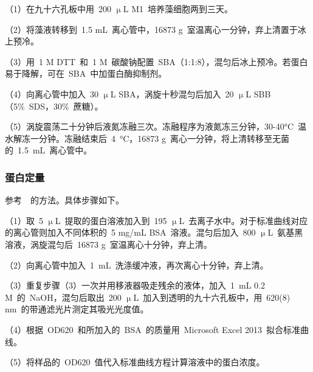 （1）在九十六孔板中用\ 200 $\upmu$L M1\ 培养藻细胞两到三天。

（2）将藻液转移到\ 1.5 mL\ 离心管中，16873 g\ 室温离心一分钟，弃上清置于冰上预冷。

（3）用\ 1 M DTT\ 和\ 1 M\ 碳酸钠配置\ SBA（1:1:8），混匀后冰上预冷。若蛋白易于降解，可在\ SBA\ 中加蛋白酶抑制剂。

（4）向离心管中加入\ 30 $\upmu$L SBA，涡旋十秒混匀后加入\ 20 $\upmu$L SBB（5\%\ SDS，30\%\ 蔗糖）。

（5）涡旋震荡二十分钟后液氮冻融三次。冻融程序为液氮冻三分钟，30-40\si{\degreeCelsius}\ 温水解冻一分钟。冻融结束后\ \SI{4}{\degreeCelsius}，16873 g\ 离心一分钟，将上清转移至无菌的\ \SI{1.5}{\mL}\ 离心管中。

\subsubsection{蛋白定量}
参考\ \citet{Hu2014}\ 的方法。具体步骤如下。

（1）取\ 5 $\upmu$L\ 提取的蛋白溶液加入到\ 195 $\upmu$L\ 去离子水中。对于标准曲线对应的离心管则加入不同体积的\ 5 mg/mL BSA\ 溶液。混匀后加入\ 800 $\upmu$L\ 氨基黑溶液，涡旋混匀后\ 16873 g\ 室温离心十分钟，弃上清。

（2）向离心管中加入\ \SI{1}{\mL}\ 洗涤缓冲液，再次离心十分钟，弃上清。

（3）重复步骤（3）一次并用移液器吸走残余的液体，加入\ \SI{1}{\mL} 0.2 M\ 的\ NaOH，混匀后取出\ 200 $\upmu$L\ 加入到透明的九十六孔板中，用\ 620(8) nm\ 的带通滤光片测定其吸光光度值。

（4）根据\ OD620\ 和所加入的\ BSA\ 的质量用\ Microsoft Excel 2013\ 拟合标准曲线。

（5）将样品的\ OD620\ 值代入标准曲线方程计算溶液中的蛋白浓度。
